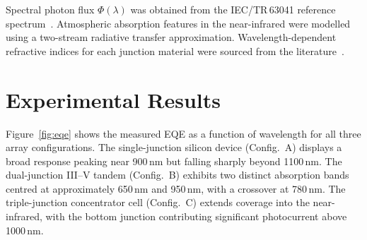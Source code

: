 \documentclass[10pt,twocolumn]{article}
\begin{document}
Spectral photon flux $\Phi(\lambda)$ was obtained from the IEC/TR\,63041 reference
spectrum~\cite{iec2018}. Atmospheric absorption features in the near-infrared were
modelled using a two-stream radiative transfer approximation. Wavelength-dependent
refractive indices for each junction material were sourced from the literature~\cite{wakabayashi2019}.

\section{Experimental Results}

Figure~\ref{fig:eqe} shows the measured EQE as a function of wavelength for all three
array configurations. The single-junction silicon device (Config.~A) displays a broad
response peaking near 900\,nm but falling sharply beyond 1100\,nm. The dual-junction
III--V tandem (Config.~B) exhibits two distinct absorption bands centred at approximately
650\,nm and 950\,nm, with a crossover at 780\,nm. The triple-junction concentrator cell
(Config.~C) extends coverage into the near-infrared, with the bottom junction contributing
significant photocurrent above 1000\,nm.
\end{document}
